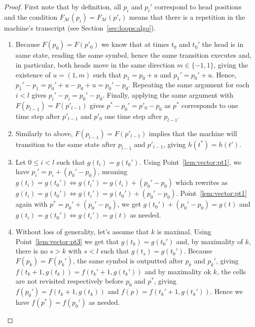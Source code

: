 \begin{proof}
    First note that by definition, all $p_i$ and $p_i'$ correspond to head positions and the condition $F_\mathcal{M}(p_i)   = F_\mathcal{M}(p'_i)$ means that there is a repetition in the machine's transcript (see Section~\ref{sec:loops:algo}).
    \begin{enumerate}
        \item Because $F(p_0) = F(p'_0)$ we know that at times $t_0$ and $t_0'$ the head is in same state, reading the same symbol, hence the same transition executes and, in particular, both heads move in the same direction $m \in \{-1,1\}$, giving the existence of $u = (1, m)$ such that $p_1 = p_0 + u$ and $p_1' = p_0' + u$. Hence, $p_1' - p_1 = p_0' + u - p_0 + u = p_0' - p_0$. Repeating the same argument for each $i < l$ gives $p_i' - p_i = p_0' - p_0$. Finally, applying the same argument with $F(p_{l-1}) = F(p'_{l-1})$ gives $p^*-p_0' = p'_0 - p_0$ as $p^*$ corresponds to one time step after $p'_{l-1}$ and $p'_0$ one time step after $p_{l-1}$.
        \item Similarly to above, $F(p_{l-1}) = F(p'_{l-1})$ implies that the machine will transition to the same state after $p_{l-1}$ and $p'_{l-1}$, giving $h(t^*) = h(t')$.

        \item Let $0 \leq i < l$ such that $g(t_i) = g(t_0')$. Using Point~\ref{lem:vector:pt1}, we have $p_i' = p_i + (p_0' - p_0)$, meaning $g(t_i) = g(t_0') \Leftrightarrow g(t_i') = g(t_i) + (p_0' - p_0)$ which rewrites as $g(t_i) = g(t_0') \Leftrightarrow g(t_i') = g(t_0') + (p_0' - p_0)$. Point~\ref{lem:vector:pt1} again with $p^* = p_0' +(p_0' - p_0)$, we get $g(t_0') + (p_0' - p_0) = g(t)$ and $g(t_i) = g(t_0') \Leftrightarrow g(t_i') = g(t)$ as needed.

        \item Without loss of generality, let's assume that $k$ is maximal. Using Point~\ref{lem:vector:pt3} we get that $g(t_k) = g(t_0')$ and, by maximality of $k$, there is no $s > k$ with $s <l$ such that $g(t_s) = g(t_0')$. Because $F(p_k) = F(p_k')$, the same symbol is outputted after $p_k$ and $p_k'$, giving $f(t_k+1,g(t_k)) = f(t_k'+1,g(t_k'))$ and by maximality ok $k$, the cells are not revisited respectively before $p_0$ and $p^*$, giving $f(p_0') = f(t_k+1,g(t_k))$ and $f(p) = f(t_k'+1,g(t_k'))$. Hence we have $f(p^*) = f(p_0')$ as needed.


    \end{enumerate}

\end{proof}

